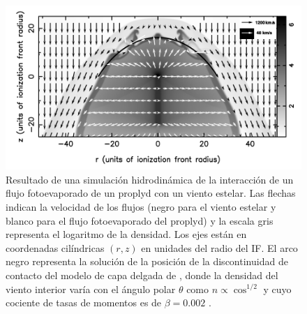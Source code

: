 \begin{figure}
  \centering
  \includegraphics[width=0.7\linewidth]{./Figures/GA-simulation}
  \caption[Simulación hidrodinámica de un choque de proa de un proplyd por \citet{Garcia-Arredondo:2001}]{Resultado de una simulación hidrodinámica de la interacción de un flujo fotoevaporado de un proplyd con un viento estelar. Las flechas indican la velocidad de los flujos (negro para el viento estelar y blanco para el flujo fotoevaporado del proplyd) y la escala gris representa el logaritmo de la densidad. Los ejes están en coordenadas cilíndricas $(r, z)$ en unidades del radio del IF. El arco negro representa la solución de la posición de la discontinuidad de contacto del modelo de capa delgada de \citet{Canto:1996}, donde la densidad del viento interior varía con el ángulo polar $\theta$ como $n\propto \cos^{1/2}$ y cuyo cociente de tasas de momentos es de $\beta=0.002$ \citep{Garcia-Arredondo:2001}.}
  \label{fig:GA-simulation}
\end{figure}

